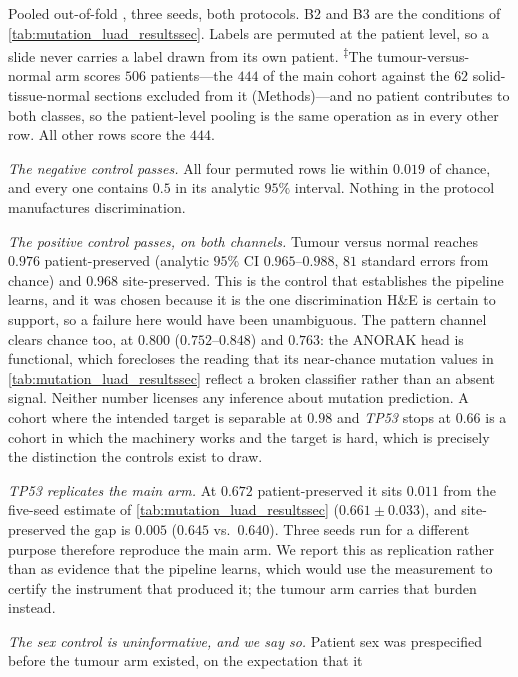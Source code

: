 \begin{flushleft}\footnotesize
Pooled out-of-fold \auroc{}, three seeds, both protocols. B2 and B3 are
the conditions of \cref{tab:mutation_luad_resultssec}. Labels are
permuted at the patient level, so a slide never carries a label drawn
from its own patient. \textsuperscript{$\ddagger$}The tumour-versus-normal
arm scores $506$ patients---the $444$ of the main cohort against the
$62$ solid-tissue-normal sections excluded from it (Methods)---and no
patient contributes to both classes, so the patient-level pooling is the
same operation as in every other row. All other rows score the $444$.
\par\medskip
\emph{The negative control passes.} All four permuted rows lie within
$0.019$ of chance, and every one contains $0.5$ in its analytic
$95\%$ interval. Nothing in the protocol manufactures discrimination.
\par\medskip
\emph{The positive control passes, on both channels.} Tumour versus
normal reaches $0.976$ patient-preserved (analytic $95\%$ CI
$0.965$--$0.988$, $81$ standard errors from chance) and $0.968$
site-preserved. This is the control that establishes the pipeline
learns, and it was chosen because it is the one discrimination H\&E is
certain to support, so a failure here would have been unambiguous. The
pattern channel clears chance too, at $0.800$ ($0.752$--$0.848$) and
$0.763$: the ANORAK head is functional, which forecloses the reading
that its near-chance mutation values in
\cref{tab:mutation_luad_resultssec} reflect a broken classifier rather
than an absent signal. Neither number licenses any inference about
mutation prediction. A cohort where the intended target is separable at
$0.98$ and \textit{TP53} stops at $0.66$ is a cohort in which the
machinery works and the target is hard, which is precisely the
distinction the controls exist to draw.
\par\medskip
\emph{\textit{TP53} replicates the main arm.} At $0.672$
patient-preserved it sits $0.011$ from the five-seed estimate of
\cref{tab:mutation_luad_resultssec} ($0.661\pm0.033$), and
site-preserved the gap is $0.005$ ($0.645$ vs.\ $0.640$). Three seeds
run for a different purpose therefore reproduce the main arm. We report
this as replication rather than as evidence that the pipeline learns,
which would use the measurement to certify the instrument that produced
it; the tumour arm carries that burden instead.
\par\medskip
\emph{The sex control is uninformative, and we say so.} Patient sex was
prespecified before the tumour arm existed, on the expectation that it

\end{flushleft}

